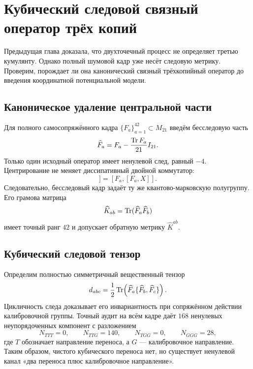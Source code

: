 \chapter{Кубический следовой связный оператор трёх копий}
\label{ch:v8-baryon-cubic-trace-connected-operator-gate}

Предыдущая глава доказала, что двухточечный процесс не определяет третью
кумулянту. Однако полный шумовой кадр уже несёт следовую метрику. Проверим,
порождает ли она канонический связный трёхкопийный оператор до введения
координатной потенциальной модели.

\section{Каноническое удаление центральной части}

Для полного самосопряжённого кадра $\{F_a\}_{a=1}^{42}\subset M_{21}$
введём бесследовую часть
\begin{equation}
 \widehat F_a=F_a-\frac{\operatorname{Tr} F_a}{21}I_{21}.
 \label{eq:v8-baryon-centered-noise-frame}
\end{equation}
Только один исходный оператор имеет ненулевой след, равный $-4$.
Центрирование не меняет диссипативный двойной коммутатор:
\begin{equation}
 [\widehat F_a,[\widehat F_a,X]]=[F_a,[F_a,X]].
 \label{eq:v8-baryon-centering-preserves-generator}
\end{equation}
Следовательно, бесследовый кадр задаёт ту же квантово-марковскую
полугруппу. Его грамова матрица
\begin{equation}
 \widehat K_{ab}=\operatorname{Tr}(\widehat F_a\widehat F_b)
 \label{eq:v8-baryon-centered-trace-metric}
\end{equation}
имеет точный ранг $42$ и допускает обратную метрику $\widehat K^{ab}$.

\section{Кубический следовой тензор}

Определим полностью симметричный вещественный тензор
\begin{equation}
 d_{abc}=\frac12\operatorname{Tr}\!\left(
 \widehat F_a\{\widehat F_b,\widehat F_c\}\right).
 \label{eq:v8-baryon-cubic-trace-tensor}
\end{equation}
Цикличность следа доказывает его инвариантность при сопряжённом действии
калибровочной группы. Точный аудит на всём кадре даёт $168$ ненулевых
неупорядоченных компонент с разложением
\begin{equation}
 N_{TTT}=0,\qquad N_{TTG}=140,\qquad
 N_{TGG}=0,\qquad N_{GGG}=28,
 \label{eq:v8-baryon-cubic-trace-support}
\end{equation}
где $T$ обозначает направление переноса, а $G$ --- калибровочное
направление. Таким образом, чистого кубического переноса нет, но существует
ненулевой канал «два переноса плюс калибровочное направление».

